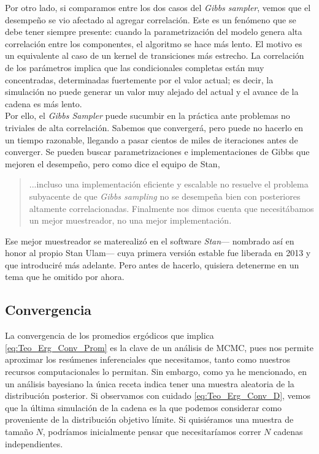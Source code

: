 Por otro lado, si comparamos entre los dos casos del \textit{Gibbs sampler}, vemos que el desempeño se vio afectado al agregar correlación. Este es un fenómeno que se debe tener siempre presente: cuando la parametrización del modelo genera alta correlación entre los componentes, el algoritmo se hace más lento. El motivo es un equivalente al caso de un kernel de transiciones más estrecho. La correlación de los parámetros implica que las condicionales completas están muy concentradas, determinadas fuertemente por el valor actual; es decir, la simulación no puede generar un valor muy alejado del actual y el avance de la cadena es más lento.\\ 

Por ello, el \textit{Gibbs Sampler} puede sucumbir en la práctica ante problemas no triviales de alta correlación. Sabemos que convergerá, pero puede no hacerlo en un tiempo razonable, llegando a pasar cientos de miles de iteraciones antes de converger. Se pueden buscar parametrizaciones e implementaciones de Gibbs que mejoren el desempeño, pero como dice el equipo de {\color{red} Stan}, 
\begin{quote}
...incluso una implementación eficiente y escalable no resuelve el problema subyacente de que \textit{Gibbs sampling} no se desempeña bien con posteriores altamente correlacionadas. Finalmente nos dimos cuenta que necesitábamos un mejor muestreador, no una mejor implementación.
\end{quote}

Ese mejor muestreador se materealizó en el software \textit{Stan}--- nombrado así en honor al propio Stan Ulam--- cuya primera versión estable fue liberada en 2013 y que introduciré más adelante. Pero antes de hacerlo, quisiera detenerme en un tema que he omitido por ahora.\\

\subsection{Convergencia}

La convergencia de los promedios ergódicos que implica \eqref{eq:Teo_Erg_Conv_Prom} es la clave de un análisis de MCMC, pues nos permite aproximar los resúmenes inferenciales que necesitamos, tanto como nuestros recursos computacionales lo permitan. Sin embargo, como ya he mencionado, en un análisis bayesiano la única receta indica tener una muestra aleatoria de la distribución posterior. Si observamos con cuidado \eqref{eq:Teo_Erg_Conv_D}, vemos que la última simulación de la cadena es la que podemos considerar como proveniente de la distribución objetivo límite. Si quisiéramos una muestra de tamaño $N$, podríamos inicialmente pensar que necesitaríamos correr $N$ cadenas independientes.\\ 

